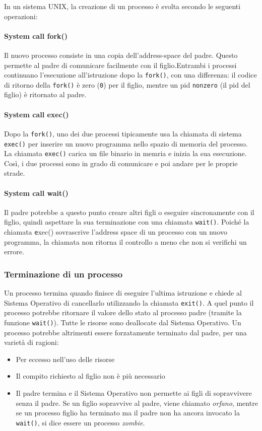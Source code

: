 \documentclass[a4paper]{article}
\begin{document}
In un sistema UNIX, la creazione di un processo è svolta secondo le seguenti operazioni:

\paragraph{System call fork()} Il nuovo processo consiste in una copia dell'address-space del padre. Questo permette al padre di comunicare facilmente con il figlio.Entrambi i processi continuano l'esecuzione all'istruzione dopo la \texttt{fork()}, con una differenza: il codice di ritorno della \texttt{fork()} è zero (\texttt{0}) per il figlio, mentre un pid \texttt{nonzero} (il pid del figlio) è ritornato al padre.
\paragraph{System call exec()} Dopo la \texttt{fork()}, uno dei due processi tipicamente usa la chiamata di sistema \texttt{exec()} per inserire un nuovo programma nello spazio di memoria del processo. La chiamata \texttt{exec()} carica un file binario in memria e inizia la sua esecuzione. Così, i due processi sono in grado di comunicare e poi andare per le proprie strade.
\paragraph{System call wait()} Il padre potrebbe a questo punto creare altri figli o eseguire sincronamente con il figlio, quindi aspettare la sua terminazione con una chiamata \texttt{wait()}. \newline
Poiché la chiamata \texttt exec() sovrascrive l'address space di un processo con un nuovo programma, la chiamata non ritorna il controllo a meno che non si verifichi un errore.

\subsubsection{Terminazione di un processo}
Un processo termina quando finisce di eseguire l'ultima istruzione e chiede al Sistema Operativo di cancellarlo utilizzando la chiamata \texttt{exit()}. A quel punto il processo potrebbe ritornare il valore dello stato al processo padre (tramite la funzione \texttt{wait()}). Tutte le risorse sono deallocate dal Sistema Operativo. \newline
Un processo potrebbe altrimenti essere forzatamente terminato dal padre, per una varietà di ragioni:
\begin{itemize}
    \item Per eccesso nell'uso delle risorse
    \item Il compito richiesto al figlio non è più necessario
    \item Il padre termina e il Sistema Operativo non permette ai figli di sopravvivere senza il padre. Se un figlio sopravvive al padre, viene chiamato \textit{orfano}, mentre se un processo figlio ha terminato ma il padre non ha ancora invocato la \texttt{wait()}, si dice essere un processo \textit{zombie}.
\end{itemize}
\end{document}
